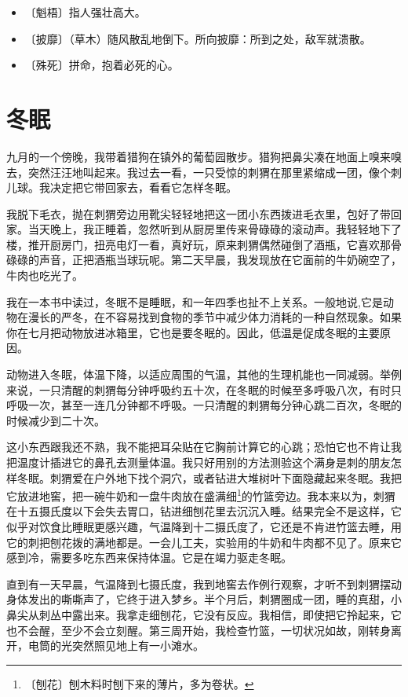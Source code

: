 \documentclass[12pt,UTF-8,openany]{ctexbook}
\begin{document}
\begin{itemize}
    \setlength\itemsep{-0.2em}
    \item 〔魁梧〕指人强壮高大。
    \item 〔披靡〕（草木）随风散乱地倒下。所向披靡：所到之处，敌军就溃散。
    \item 〔殊死〕拼命，抱着必死的心。
\end{itemize}

\chapter{冬眠}

\begin{large}
    
    九月的一个傍晚，我带着猎狗在镇外的葡萄园散步。猎狗把鼻尖凑在地面上嗅来嗅去，突然汪汪地叫起来。我过去一看，一只受惊的刺猬在那里紧缩成一团，像个刺儿球。我决定把它带回家去，看看它怎样冬眠。
    
    我脱下毛衣，抛在刺猬旁边用靴尖轻轻地把这一团小东西拨进毛衣里，包好了带回家。当天晚上，我正睡着，忽然听到从厨房里传来骨碌碌的滚动声。我轻轻地下了楼，推开厨房门，扭亮电灯一看，真好玩，原来刺猬偶然碰倒了酒瓶，它喜欢那骨碌碌的声音，正把酒瓶当球玩呢。第二天早晨，我发现放在它面前的牛奶碗空了，牛肉也吃光了。
    
    我在一本书中读过，冬眠不是睡眠，和一年四季也扯不上关系。一般地说,它是动物在漫长的严冬，在不容易找到食物的季节中减少体力消耗的一种自然现象。如果你在七月把动物放进冰箱里，它也是要冬眠的。因此，低温是促成冬眠的主要原因。
    
    动物进入冬眠，体温下降，以适应周围的气温，其他的生理机能也一同减弱。举例来说，一只清醒的刺猬每分钟呼吸约五十次，在冬眠的时候至多呼吸八次，有时只呼吸一次，甚至一连几分钟都不呼吸。一只清醒的刺猬每分钟心跳二百次，冬眠的时候减少到二十次。
    
    这小东西跟我还不熟，我不能把耳朵贴在它胸前计算它的心跳；恐怕它也不肯让我把温度计插进它的鼻孔去测量体温。我只好用别的方法测验这个满身是刺的朋友怎样冬眠。刺猬爱在户外地下找个洞穴，或者钻进大堆树叶下面隐藏起来冬眠。我把它放进地窖，把一碗牛奶和一盘牛肉放在盛满细\footnote{〔刨花〕刨木料时刨下来的薄片，多为卷状。}的竹篮旁边。我本来以为，刺猬在十五摄氏度以下会失去胃口，钻进细刨花里去沉沉入睡。结果完全不是这样，它似乎对饮食比睡眠更感兴趣，气温降到十二摄氏度了，它还是不肯进竹篮去睡，用它的刺把刨花拨的满地都是。一会儿工夫，实验用的牛奶和牛肉都不见了。原来它感到冷，需要多吃东西来保持体温。它是在竭力驱走冬眠。
    
    直到有一天早晨，气温降到七摄氏度，我到地窖去作例行观察，才听不到刺猬摆动身体发出的嘶嘶声了，它终于进入梦乡。半个月后，刺猬圈成一团，睡的真甜，小鼻尖从刺丛中露出来。我拿走细刨花，它没有反应。我相信，即使把它拎起来，它也不会醒，至少不会立刻醒。第三周开始，我检查竹篮，一切状况如故，刚转身离开，电筒的光突然照见地上有一小滩水。
    

\end{large}
\end{document}

